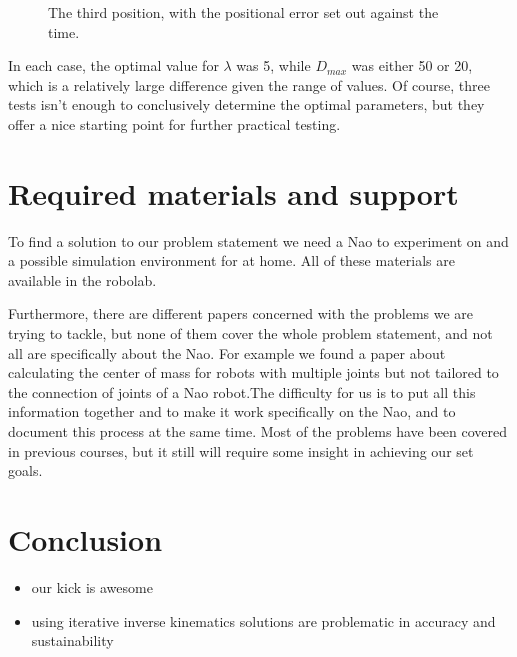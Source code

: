 \documentclass[a4paper]{article}
\begin{document}
\begin{figure}[htbp]
  \centering
  \caption{The third position, with the positional error set out against
         the time.}
  \label{fig:ik_plot3}
\end{figure}
\FloatBarrier

In each case, the optimal value for $\lambda$ was 5, while $D_{max}$ was either
50 or 20, which is a relatively large difference given the range of values. Of
course, three tests isn't enough to conclusively determine the optimal
parameters, but they offer a nice starting point for further practical testing.

\section{Required materials and support} 
To find a solution to our problem statement we need a Nao to experiment on and a
possible simulation environment for at home. All of these materials are
available in the robolab.

Furthermore, there are different papers concerned with the problems we are
trying to tackle, but none of them cover the whole problem statement, and not
all are specifically about the Nao. For example we found a paper about
calculating the center of mass for robots with multiple joints\cite{Cotton2008} but not tailored
to the connection of joints of a  Nao robot.The difficulty for us is to put all this
information together and to make it work specifically on the Nao, and to
document this process at the same time. Most of the problems have been covered
in previous courses, but it still will require some insight in achieving our set
goals.

\section{Conclusion}
\begin{itemize}
    \item our kick is awesome
    \item using iterative inverse kinematics solutions are problematic in
        accuracy and sustainability
\end{itemize}
\end{document}
